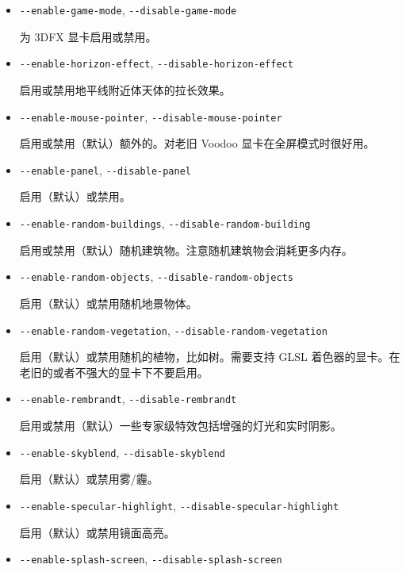 \begin{itemize}
{\begin{itemize}
  启用，禁用（默认）全屏模式。

\item{\texttt{-$ $-enable-game-mode}, \texttt{-$ $-disable-game-mode}}

  为 3DFX 显卡启用或禁用。

\item{\texttt{-$ $-enable-horizon-effect}, \texttt{-$ $-disable-horizon-effect}}

  启用或禁用地平线附近体天体的拉长效果。

 \item{\texttt{-$ $-enable-mouse-pointer}, \texttt{-$ $-disable-mouse-pointer}}

  启用或禁用（默认）额外的。对老旧 Voodoo 显卡在全屏模式时很好用。

\item{\texttt{-$ $-enable-panel}, \texttt{-$ $-disable-panel}}

 启用（默认）或禁用。

\item{\texttt{-$ $-enable-random-buildings}, \texttt{-$ $-disable-random-building}}

 启用或禁用（默认）随机建筑物。注意随机建筑物会消耗更多内存。

\item{\texttt{-$ $-enable-random-objects}, \texttt{-$ $-disable-random-objects}}

 启用（默认）或禁用随机地景物体。

 \item{\texttt{-$ $-enable-random-vegetation}, \texttt{-$ $-disable-random-vegetation}}

 启用（默认）或禁用随机的植物，比如树。需要支持 GLSL 着色器的显卡。在老旧的或者不强大的显卡下不要启用。

\item{\texttt{-$ $-enable-rembrandt}, \texttt{-$ $-disable-rembrandt}}

 启用或禁用（默认）一些专家级特效包括增强的灯光和实时阴影。

\item{\texttt{-$ $-enable-skyblend}, \texttt{-$ $-disable-skyblend}}

 启用（默认）或禁用雾/霾。

\item{\texttt{-$ $-enable-specular-highlight}, \texttt{-$ $-disable-specular-highlight}}

  启用（默认）或禁用镜面高亮。

\item{\texttt{-$ $-enable-splash-screen}, \texttt{-$ $-disable-splash-screen}}


\end{itemize}}
\end{itemize}
